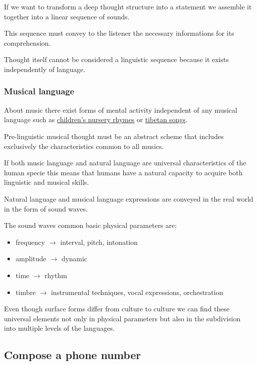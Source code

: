 If we want to transform a deep thought structure into a statement we assemble it together into a linear sequence of sounds.

This sequence must convey to the listener the necessary informations for its comprehension.

Thought itself cannot be considered a linguistic sequence because it exists independently of language.

\subsubsection{Musical language}\label{musical-language}

About music there exist forms of mental activity independent of any musical language such as \href{https://github.com/musicaecodice/EMC/blob/main/1_premises/suoni/bimbi.mp3}{children's nursery rhymes} or \href{https://github.com/musicaecodice/EMC/blob/main/1_premises/suoni/tibet.mp3}{tibetan songs}.

Pre-linguistic musical thought must be an abstract scheme that includes exclusively the characteristics common to all musics.

If both music language and natural language are universal characteristics of the human specie this means that humans have a natural capacity to acquire both linguistic and musical skills.

Natural language and musical language expressions are conveyed in the real world in the form of sound waves.

The sound waves common basic physical parameters are: 

\begin{itemize}
\tightlist
\item frequency \(\rightarrow\) interval, pitch, intonation 
\item amplitude \(\rightarrow\) dynamic 
\item time \(\rightarrow\) rhythm 
\item timbre \(\rightarrow\) instrumental techniques, vocal expressions, orchestration
\end{itemize}

Even though surface forms differ from culture to culture we can find these universal elements not only in physical parameters but also in the subdivision into multiple levels of the languages.

\subsection{Compose a phone number}\label{compose-a-phone-number}

